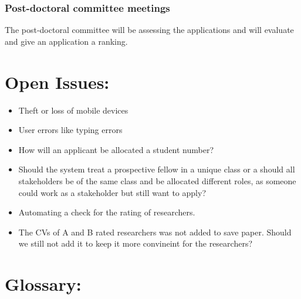 \documentclass[12pt]{article}
\begin{document}
		\subsubsection{Post-doctoral committee meetings}
		The post-doctoral committee will be assessing the applications and will evaluate and give an application a ranking.
		
	\newpage	
	\section{Open Issues:} %
	\vspace{0.2in}
	
	\begin{itemize}
		\item Theft or loss of mobile devices
		\item User errors like typing errors
		\item How will an applicant be allocated a student number?
		\item Should the system treat a prospective fellow in a unique class or a should all stakeholders be of the same class and be allocated different roles, as someone could work as a stakeholder but still want to apply?
		\item Automating a check for the rating of researchers.
		\item The CVs of A and B rated researchers was not added to save paper. Should we still not add it to keep it more convineint for the researchers?
	\end{itemize}
	
	
	\vspace{0.5in}
	
	\newpage
	\section{Glossary:} %
	\vspace{0.2in}
	
\end{document}
